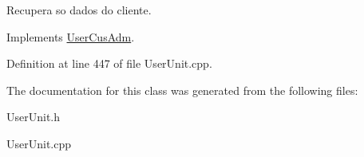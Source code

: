 Recupera so dados do cliente. 



Implements \hyperlink{classUserCusAdm_a8a67bf25c965e931be912f33449e0f8a}{User\-Cus\-Adm}.



Definition at line 447 of file User\-Unit.\-cpp.



The documentation for this class was generated from the following files\-:\begin{DoxyCompactItemize}
\item 
User\-Unit.\-h\item 
User\-Unit.\-cpp\end{DoxyCompactItemize}
